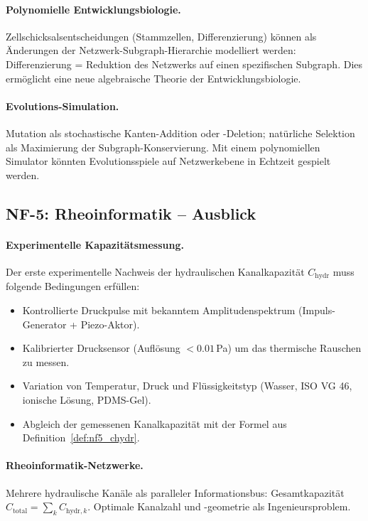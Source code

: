 ﻿\documentclass[a4paper,12pt]{scrreprt}
\theoremstyle{definition}
\begin{document}
\paragraph{Polynomielle Entwicklungsbiologie.}
Zellschicksalsentscheidungen (Stammzellen, Differenzierung) können als
Änderungen der Netzwerk-Subgraph-Hierarchie modelliert werden:
Differenzierung = Reduktion des Netzwerks auf einen spezifischen
Subgraph. Dies ermöglicht eine neue algebraische Theorie der
Entwicklungsbiologie.

\paragraph{Evolutions-Simulation.}
Mutation als stochastische Kanten-Addition oder -Deletion; natürliche
Selektion als Maximierung der Subgraph-Konservierung. Mit einem
polynomiellen Simulator könnten Evolutionsspiele
auf Netzwerkebene in Echtzeit gespielt werden.

\subsection*{NF-5: Rheoinformatik -- Ausblick}

\paragraph{Experimentelle Kapazitätsmessung.}
Der erste experimentelle Nachweis der hydraulischen Kanalkapazität
$C_\mathrm{hydr}$ muss folgende Bedingungen erfüllen:
\begin{itemize}
  \item Kontrollierte Druckpulse mit bekanntem Amplitudenspektrum
    (Impuls-Generator + Piezo-Aktor).
  \item Kalibrierter Drucksensor (Auflösung $< 0.01$\,Pa) um
    das thermische Rauschen zu messen.
  \item Variation von Temperatur, Druck und Flüssigkeitstyp
    (Wasser, ISO VG 46, ionische Lösung, PDMS-Gel).
  \item Abgleich der gemessenen Kanalkapazität mit der
    Formel aus Definition~\ref{def:nf5_chydr}.
\end{itemize}

\paragraph{Rheoinformatik-Netzwerke.}
Mehrere hydraulische Kanäle als paralleler Informationsbus:
Gesamtkapazität $C_\mathrm{total} = \sum_k C_{\mathrm{hydr},k}$.
Optimale Kanalzahl und -geometrie als Ingenieursproblem.
\end{document}

